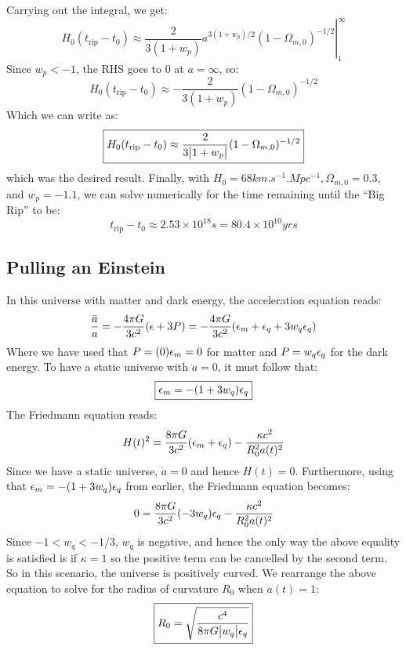 Carrying out the integral, we get:
\begin{equation}
    H_0(t_{\text{rip}} - t_0) \approx \left. \frac{2}{3(1+w_p)}a^{3(1+w_p)/2}(1 - \Omega_{m, 0})^{-1/2}\right|_{1}^\infty
\end{equation}
Since $w_p < -1$, the RHS goes to $0$ at $a = \infty$, so:
\begin{equation}
    H_0(t_{\text{rip}} - t_0) \approx -\frac{2}{3(1+w_p)}(1 - \Omega_{m, 0})^{-1/2}
\end{equation}
Which we can write as:
\begin{equation}
    \boxed{H_0(t_{\text{rip}} - t_0) \approx \frac{2}{3\abs{1+w_p}}(1 - \Omega_{m, 0})^{-1/2}}
\end{equation}
which was the desired result. Finally, with $H_0 = 68\si{km.s^{-1}.Mpc^{-1}}, \Omega_{m, 0} = 0.3$, and $w_p = -1.1$, we can solve numerically for the time remaining until the ``Big Rip'' to be:
\begin{equation}
    \boxed{t_{\text{rip}} - t_0 \approx 2.53 \times 10^{18}\si{s} = 80.4 \times 10^{10}\si{yrs}}
\end{equation}

\subsection{Pulling an Einstein}
In this universe with matter and dark energy, the acceleration equation reads:
\begin{equation}
    \frac{\ddot{a}}{a} = -\frac{4\pi G}{3c^2}(\epsilon + 3P) = -\frac{4\pi G}{3c^2}(\epsilon_m + \epsilon_q + 3w_q \epsilon_q)
\end{equation}
Where we have used that $P = (0)\epsilon_m = 0$ for matter and $P = w_q\epsilon_q$ for the dark energy. To have a static universe with $\ddot{a} = 0$, it must follow that:
\begin{equation}
    \boxed{\epsilon_m = -(1 + 3w_q)\epsilon_q}
\end{equation}
The Friedmann equation reads:
\begin{equation}
    H(t)^2 = \frac{8\pi G}{3c^2}(\epsilon_m + \epsilon_q) - \frac{\kappa c^2}{R_0^2a(t)^2}
\end{equation}
Since we have a static universe, $\dot{a} = 0$ and hence $H(t) = 0$. Furthermore, using that $\epsilon_m = -(1 + 3w_q)\epsilon_q$ from earlier, the Friedmann equation becomes:
\begin{equation}
    0 = \frac{8\pi G}{3c^2}(-3w_q)\epsilon_q - \frac{\kappa c^2}{R_0^2a(t)^2}
\end{equation}
Since $-1 < w_q < -1/3$, $w_q$ is negative, and hence the only way the above equality is satisfied is if $\kappa = 1$ so the positive term can be cancelled by the second term. So in this scenario, $\boxed{\text{the universe is positively curved}}$. We rearrange the above equation to solve for the radius of curvature $R_0$ when $a(t) = 1$:
\begin{equation}
    \boxed{R_0 = \sqrt{\frac{c^4}{8\pi G \abs{w_q} \epsilon_q}}}
\end{equation}

